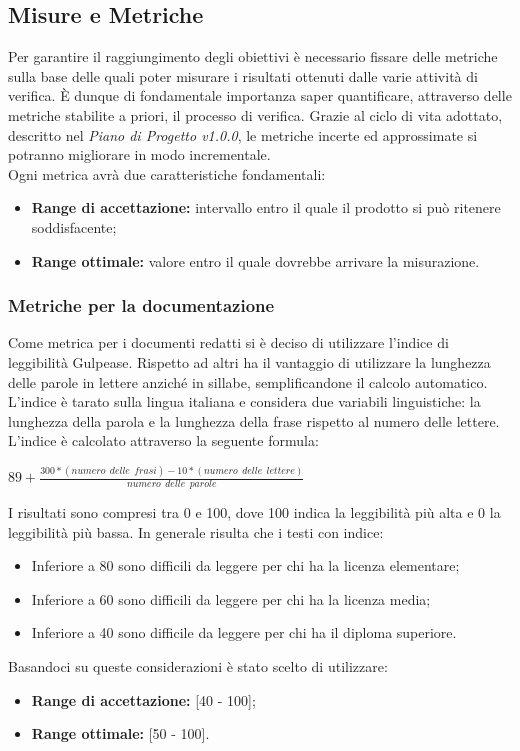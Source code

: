 \subsection{Misure e Metriche}
Per garantire il raggiungimento degli obiettivi è necessario fissare delle metriche sulla base delle quali poter misurare i risultati ottenuti dalle varie attività di verifica. È dunque di fondamentale importanza saper quantificare, attraverso delle metriche stabilite a priori, il processo di verifica. Grazie al ciclo di vita adottato, descritto nel \textit{Piano di Progetto v1.0.0}, le metriche incerte ed approssimate si potranno migliorare in modo incrementale.\\
Ogni metrica avrà due caratteristiche fondamentali:
\begin{itemize}
	\item \textbf{Range di accettazione:} intervallo entro il quale il prodotto si può ritenere soddisfacente;
	\item \textbf{Range ottimale:} valore entro il quale dovrebbe arrivare la misurazione.
\end{itemize} 
	\subsubsection{Metriche per la documentazione}
	Come metrica per i documenti redatti si è deciso di utilizzare l'indice di leggibilità \gls{Gulpease}. Rispetto ad altri ha il vantaggio di utilizzare la lunghezza delle parole in lettere anziché in sillabe, semplificandone il calcolo automatico. L'indice è tarato sulla lingua italiana e considera due variabili linguistiche: la lunghezza della parola e la lunghezza della frase rispetto al numero delle lettere. \\
	\noindent L'indice è calcolato attraverso la seguente formula:\\
	\begin{center}
	$89+ \frac{300*\left(numero\:\ delle\:\ frasi \right)-10*\left(numero\:\ delle\:\ lettere\right)}{numero\:\ delle\:\ parole}$
	\end{center}
	I risultati sono compresi tra 0 e 100, dove 100 indica la leggibilità più alta e 0 la leggibilità più bassa. In generale risulta che i testi con indice:
	\begin{itemize}
		\item Inferiore a 80 sono difficili da leggere per chi ha la licenza elementare;
		\item Inferiore a 60 sono difficili da leggere per chi ha la licenza media;
		\item Inferiore a 40 sono difficile da leggere per chi ha il diploma superiore.
	\end{itemize}
	Basandoci su queste considerazioni è stato scelto di utilizzare:
	\begin{itemize}
		\item \textbf{Range di accettazione:} [40 - 100];
		\item \textbf{Range ottimale:} [50 - 100].
	\end{itemize}
	
